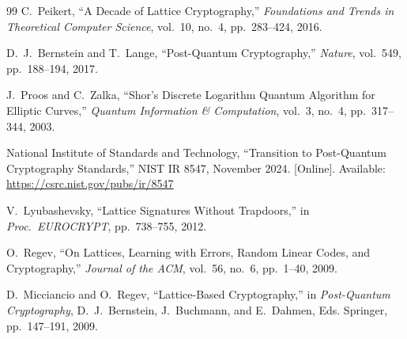 \documentclass[12pt, a4paper, twocolumn]{article}
\begin{document}
\begin{thebibliography}{99}
C.~Peikert, ``A Decade of Lattice Cryptography,'' \textit{Foundations and Trends in Theoretical Computer Science}, vol.~10, no.~4, pp.~283--424, 2016.

D.~J.~Bernstein and T.~Lange, ``Post-Quantum Cryptography,'' \textit{Nature}, vol.~549, pp.~188--194, 2017.

J.~Proos and C.~Zalka, ``Shor's Discrete Logarithm Quantum Algorithm for Elliptic Curves,'' \textit{Quantum Information \& Computation}, vol.~3, no.~4, pp.~317--344, 2003.

National Institute of Standards and Technology, ``Transition to Post-Quantum Cryptography Standards,'' NIST IR 8547, November 2024. [Online]. Available: \url{https://csrc.nist.gov/pubs/ir/8547}

V.~Lyubashevsky, ``Lattice Signatures Without Trapdoors,'' in \textit{Proc.\ EUROCRYPT}, pp.~738--755, 2012.

O.~Regev, ``On Lattices, Learning with Errors, Random Linear Codes, and Cryptography,'' \textit{Journal of the ACM}, vol.~56, no.~6, pp.~1--40, 2009.

D.~Micciancio and O.~Regev, ``Lattice-Based Cryptography,'' in \textit{Post-Quantum Cryptography}, D.~J.~Bernstein, J.~Buchmann, and E.~Dahmen, Eds. Springer, pp.~147--191, 2009.

\end{thebibliography}
\end{document}
